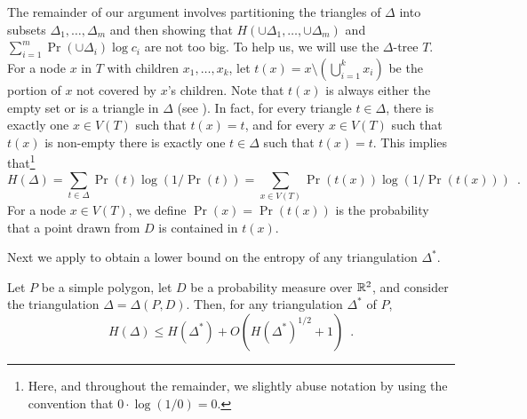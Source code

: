 \documentclass[lotsofwhite]{patmorin}
\begin{document}
The remainder of our argument involves partitioning the triangles of
$\Delta$ into subsets $\Delta_1,\ldots,\Delta_m$ and then showing that
$H(\cup\Delta_1,\ldots,\cup\Delta_m)$ and $\sum_{i=1}^m \Pr(\cup\Delta_i)\log
c_i$ are not too big.  To help us, we will use the $\Delta$-tree $T$.
For a node $x$ in $T$ with children $x_1,\ldots,x_k$, let $t(x) = x
\setminus (\bigcup_{i=1}^k x_i)$ be the portion of $x$ not covered by
$x$'s children.  Note that $t(x)$ is always either the empty set or is
a triangle in $\Delta$ (see ).  In fact, for every
triangle $t\in\Delta$, there is exactly one $x\in V(T)$ such that
$t(x)=t$, and for every $x\in V(T)$ such that $t(x)$ is non-empty
there is exactly one $t\in\Delta$ such that $t(x)=t$.  This implies
that\footnote{Here, and throughout the remainder, we slightly abuse
notation by using the convention that $0\cdot\log(1/0)=0$.}
\[
    H(\Delta) = \sum_{t\in\Delta}\Pr(t)\log(1/\Pr(t)) =
       \sum_{x\in V(T)}\Pr(t(x))\log(1/\Pr(t(x))) \enspace .
\]
For a node $x\in V(T)$, we define $\Pr(x)=\Pr(t(x))$ is the
probability that a point drawn from $D$ is contained in $t(x)$.

Next we apply  to obtain a lower bound on the
entropy of any triangulation $\Delta^*$. 

\begin{lem}
Let $P$ be a simple polygon, let $D$ be a probability measure over
$\mathbb{R}^2$, and consider the triangulation $\Delta=\Delta(P,D)$.
Then, for any triangulation $\Delta^*$ of $P$,
\[
    H(\Delta) \le H(\Delta^*) + O(H(\Delta^*)^{1/2}+1) \enspace .
\]
\end{lem}
\end{document}
